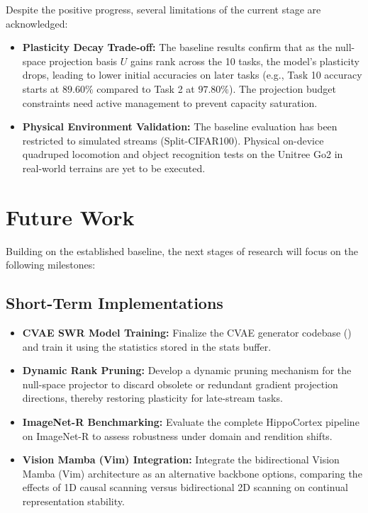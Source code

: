 Despite the positive progress, several limitations of the current stage are acknowledged:
\begin{itemize}
    \item \textbf{Plasticity Decay Trade-off:} The baseline results confirm that as the null-space projection basis $U$ gains rank across the 10 tasks, the model's plasticity drops, leading to lower initial accuracies on later tasks (e.g., Task 10 accuracy starts at $89.60\%$ compared to Task 2 at $97.80\%$). The projection budget constraints need active management to prevent capacity saturation.
    \item \textbf{Physical Environment Validation:} The baseline evaluation has been restricted to simulated streams (Split-CIFAR100). Physical on-device quadruped locomotion and object recognition tests on the Unitree Go2 in real-world terrains are yet to be executed.
\end{itemize}

\section{Future Work}
\label{sec:future_work}

Building on the established baseline, the next stages of research will focus on the following milestones:

\subsection{Short-Term Implementations}
\label{subsec:short_term}
\begin{itemize}
    \item \textbf{CVAE SWR Model Training:} Finalize the CVAE generator codebase (\allowbreak{}) and train it using the statistics stored in the stats buffer.
    \item \textbf{Dynamic Rank Pruning:} Develop a dynamic pruning mechanism for the null-space projector to discard obsolete or redundant gradient projection directions, thereby restoring plasticity for late-stream tasks.
    \item \textbf{ImageNet-R Benchmarking:} Evaluate the complete HippoCortex pipeline on ImageNet-R to assess robustness under domain and rendition shifts.
    \item \textbf{Vision Mamba (Vim) Integration:} Integrate the bidirectional Vision Mamba (Vim) \cite{zhuVisionMambaEfficient2024} architecture as an alternative backbone options, comparing the effects of 1D causal scanning versus bidirectional 2D scanning on continual representation stability.
\end{itemize}

